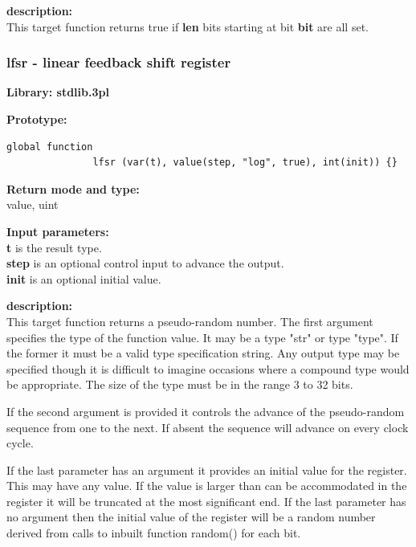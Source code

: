             {\bf description:} \\
            This target function returns true if {\bf len} bits starting at
            bit {\bf bit} are all set.



        \subsubsection{lfsr - linear feedback shift register}\label{sec:lfsr}

            {\bf Library: stdlib.3pl}

            {\bf Prototype:} \\
            \vsp
            \begin{lstlisting}[gobble=12, language=threepl]
               global function
               lfsr (var(t), value(step, "log", true), int(init)) {}
            \end{lstlisting}

            {\bf Return mode and type:} \\
            value, uint

            {\bf Input parameters:} \\            
            {\bf t} is the result type. \\
            {\bf step} is an optional control input to advance the output. \\
            {\bf init} is an optional initial value.

            {\bf description:} \\
            This target function returns a pseudo-random number. The first
            argument specifies the type of the function value. It may be
            a type "str" or type "type". If the former it must be a valid
            type specification string. Any output type may be specified though
            it is difficult to imagine occasions where a compound type would
            be appropriate. The size of the type must be in the range 3 to 32
            bits.
            
            If the second argument is provided it controls the advance of the
            pseudo-random sequence from one to the next. If absent the sequence
            will advance on every clock cycle.
            
            If the last parameter has an argument it provides an initial
            value for the register. This may have any value. If the value
            is larger than can be accommodated in the register it will be
            truncated at the most significant end. If the last parameter
            has no argument then the initial value of the register will
            be a random number derived from calls to inbuilt function
            random() for each bit.
            
